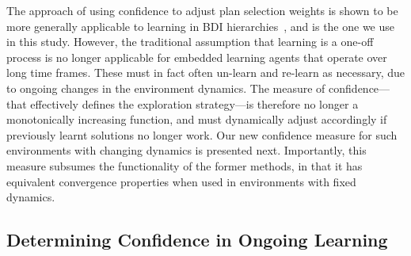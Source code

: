 The approach of using confidence to adjust plan selection weights is shown to be more generally applicable to learning in BDI hierarchies~\cite{singh10:extending,singh10:learning}, and is the one we use in this study. However, the traditional assumption that learning is a one-off process is no longer applicable for embedded learning agents that operate over long time frames. These must in fact often un-learn and re-learn as necessary, due to ongoing changes in the environment dynamics. The measure of confidence---that effectively defines the exploration strategy---is therefore no longer a monotonically increasing function, and must dynamically adjust accordingly if previously learnt solutions no longer work. Our new confidence measure for such environments with changing dynamics is presented next. 
Importantly, this measure subsumes the functionality of the former methods, in that it has equivalent convergence properties when used in environments with fixed dynamics. 

\subsection{Determining Confidence in Ongoing Learning}\label{sec:confidence}

\newcommand{\ds}{\zeta}
\newcommand{\app}{\mathname{app}}
\newcommand{\stable}{\mathname{stable}}


